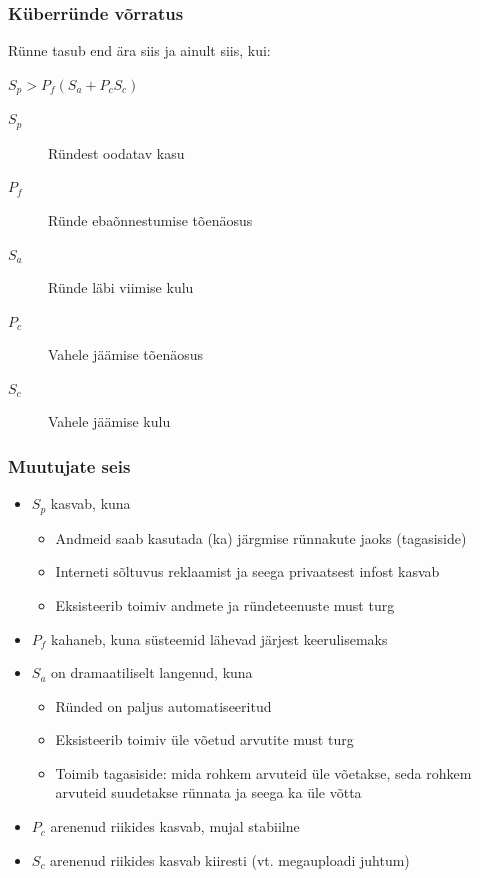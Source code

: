 \begin{frame}[fragile]
  \frametitle{Küberründe võrratus}
	\begin{center}
	  Rünne tasub end ära siis ja ainult siis, kui:\par
		$S_p>P_f(S_a + P_c S_c)$
	\vfill
	\begin{description}
		\item[$S_p$] Ründest oodatav kasu
		\item[$P_f$] Ründe ebaõnnestumise tõenäosus
		\item[$S_a$] Ründe läbi viimise kulu
		\item[$P_c$] Vahele jäämise tõenäosus
		\item[$S_c$] Vahele jäämise kulu
	\end{description}
	\end{center}

\end{frame}

\begin{frame}[fragile]
  \frametitle{Muutujate seis}
	\begin{itemize}
		\item $S_p$ kasvab, kuna 
			\begin{itemize}
				\item Andmeid saab kasutada (ka) järgmise rünnakute jaoks (tagasiside) 
				\item Interneti sõltuvus reklaamist ja seega privaatsest infost kasvab
				\item Eksisteerib toimiv andmete ja ründeteenuste must turg
			\end{itemize}
		\item $P_f$ kahaneb, kuna süsteemid lähevad järjest keerulisemaks
		\item $S_a$ on dramaatiliselt langenud, kuna 
			\begin{itemize}
				\item Ründed on paljus automatiseeritud
				\item Eksisteerib toimiv üle võetud arvutite must turg
				\item Toimib tagasiside: mida rohkem arvuteid üle võetakse, seda rohkem arvuteid suudetakse rünnata ja seega ka üle võtta
			\end{itemize}
		\item $P_c$ arenenud riikides kasvab, mujal stabiilne
		\item $S_c$ arenenud riikides kasvab kiiresti (vt. megauploadi juhtum)
	\end{itemize}
\end{frame}


